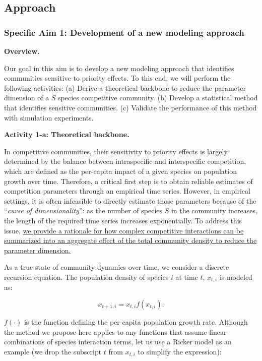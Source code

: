 \documentclass[12pt, class=article, crop=false]{standalone}
\begin{document}
\subsection*{Approach}

\subsubsection*{Specific Aim 1: Development of a new modeling approach}

\textbf{Overview.}

Our goal in this aim is to develop a new modeling approach that identifies communities sensitive to priority effects.
To this end, we will perform the following activities: (a) Derive a theoretical backbone to reduce the parameter dimension of a $S$ species competitive community. (b) Develop a statistical method that identifies sensitive communities. (c) Validate the performance of this method with simulation experiments.

\textbf{Activity 1-a: Theoretical backbone.}

In competitive communities, their sensitivity to priority effects is largely determined by the balance between intraspecific and interspecific competition, which are defined as the per-capita impact of a given species on population growth over time. Therefore, a critical first step is to obtain reliable estimates of competition parameters through an empirical time series. However, in empirical settings, it is often infeasible to directly estimate those parameters because of the ``\textit{curse of dimensionality}'': as the number of species $S$ in the community increases, the length of the required time series increases exponentially.  To address this issue, \ul{we provide a rationale for how complex competitive interactions can be summarized into an aggregate effect of the total community density to reduce the parameter dimension.}

As a true state of community dynamics over time, we consider a discrete recursion equation. The population density of species $i$ at time $t$, $x_{t,i}$ is modeled as:

\begin{equation}
\label{eq:m0}
x_{t + 1, i} = x_{t, i} f(x_{t, i}).
\end{equation}

$f(\cdot)$ is the function defining the per-capita population growth rate.
Although the method we propose here applies to any functions that assume linear combinations of species interaction terms, let us use a Ricker model as an example (we drop the subscript $t$ from $x_{t,i}$ to simplify the expression):
\end{document}
